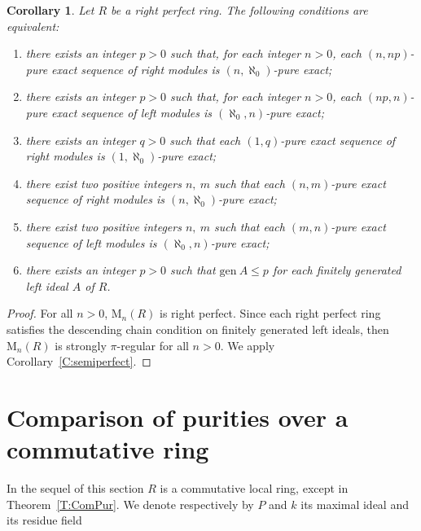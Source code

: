 \documentclass{amsart}
\newtheorem{corollary}[theorem]{Corollary}
\begin{document}
\begin{corollary}
\label{C:perfect} Let $R$ be a right perfect ring. The following conditions are equivalent:
\begin{enumerate}
\item there exists an  integer $p>0$ such that, for each  integer $n>0$, each $(n,np)$-pure exact sequence of right modules is $(n,\aleph_0)$-pure exact;
\item there exists an  integer $p>0$ such that, for each  integer $n>0$, each $(np,n)$-pure exact sequence of left modules is $(\aleph_0,n)$-pure exact;
\item there exists an  integer $q>0$ such that each $(1,q)$-pure exact sequence of right modules is $(1,\aleph_0)$-pure exact;
\item there exist two positive integers $n,\ m$ such that each $(n,m)$-pure exact sequence of right modules is $(n,\aleph_0)$-pure exact;
\item there exist two positive integers $n,\ m$ such that  each $(m,n)$-pure exact sequence of left modules is $(\aleph_0,n)$-pure exact;
\item there exists an integer $p>0$ such that $\mathrm{gen}\ A\leq p$ for each finitely generated left ideal $A$ of $R$.
\end{enumerate}
\end{corollary}
\begin{proof}
For all $n>0$,  $\mathrm{M}_n(R)$ is right perfect. Since each right perfect ring satisfies the descending chain condition on finitely generated left ideals, then $\mathrm{M}_n(R)$ is strongly $\pi$-regular  for all $n>0$. We apply Corollary~\ref{C:semiperfect}.
\end{proof}

\section{Comparison of purities over a commutative ring}
\label{S:commutative}




In the sequel of this section $R$ is a  commutative local ring, except in Theorem~\ref{T:ComPur}. We  denote respectively by $P$ and $k$ its maximal ideal and  its residue field 
\end{document}
